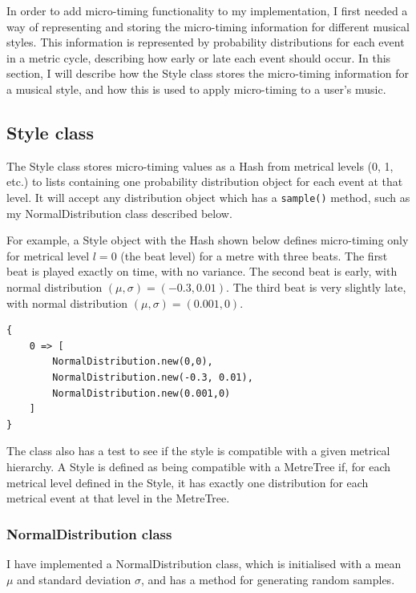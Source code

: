 \documentclass[12pt,twoside,openright]{report}
\begin{document}
In order to add micro-timing functionality to my implementation, I first needed
a way of representing and storing the micro-timing information for different
musical styles. This information is represented by probability distributions for
each event in a metric cycle, describing how early or late each event should
occur. In this section, I will describe how the
Style class stores the micro-timing information for a musical style, and how
this is used to apply micro-timing to a user's music.


\subsection{Style class} \label{style_class}

The Style class stores micro-timing values as a Hash from metrical levels (0, 1,
etc.) to lists containing one probability distribution object for each event at
that level. It will accept any distribution object which has a \verb'sample()' method,
such as my NormalDistribution class described below.

For example, a Style object with the Hash shown below defines micro-timing only for metrical level
$l=0$ (the beat level) for a metre with three beats. The first beat is played exactly on time,
with no variance. The second beat is early, with normal distribution $(\mu,\sigma)=(-0.3,0.01)$.
The third beat is very slightly late, with normal distribution $(\mu,\sigma)=(0.001,0)$.

\begin{verbatim}
{
    0 => [
        NormalDistribution.new(0,0),
        NormalDistribution.new(-0.3, 0.01),
        NormalDistribution.new(0.001,0)
    ]
}
\end{verbatim}

The class also has a test to see if the style is compatible with a given metrical
hierarchy. A Style is defined as being compatible with a MetreTree if, for each
metrical level defined in the Style, it has exactly one distribution for each
metrical event at that level in the MetreTree.

\subsubsection{NormalDistribution class} \label{normal_distribution}

I have implemented a NormalDistribution class, which is initialised with a mean $\mu$ and standard deviation
$\sigma$, and has a method for generating random samples.
\end{document}
